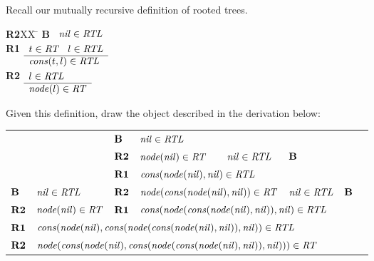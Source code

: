 \documentclass[addpoints]{exam}
\theoremstyle{definition}
\newcommand{\id}[1]{\mbox{\it #1\/}}
\newcommand{\bid}[1]{\mbox{\bf #1}}
\begin{document}
\begin{questions}
\question[3] 
Recall our mutually recursive definition of rooted trees.
\begin{tabbing}
{\bf R2}XX \=  \kill
{\bf B} \>
        \(\begin{array}[t]{l}
        \id{nil}\in\id{RTL}
        \end{array}\) \\[2ex]
{\bf R1} \>
        \(\begin{array}[t]{l}
        t\in\id{RT}\;\;\;l\in\id{RTL} \\
        \hline
        \id{cons}(t,l)\in\id{RTL}
        \end{array}\) \\[2ex]
{\bf R2} \>
        \(\begin{array}[t]{l}
        l\in\id{RTL} \\
        \hline
        \id{node}(l)\in\id{RT}
        \end{array}\)
\end{tabbing}

Given this definition, draw the object described in the derivation below: 

\begin{tabular}{llllllll}
           &                                 & $\bid{B}$             & $\id{nil}\in\id{RTL}$ & & & &\\ 
\cline{4-4}
           &                                 & $\bid{R2}$            & $\id{node}(\id{nil})\in\id{RT}$ & $\id{nil}\in\id{RTL}$ & $\bid{B}$ & & \\ 
\cline{4-5}
           &                                 & $\bid{R1}$            & \multicolumn{2}{l}{$\id{cons}(\id{node}(\id{nil}),\id{nil})\in\id{RTL}$}  & & &\\
\cline{4-5}
$\bid{B}$  & $\id{nil}\in\id{RTL}$           & $\bid{R2}$            & \multicolumn{2}{l}{$\id{node}(\id{cons}(\id{node}(\id{nil}),\id{nil}))\in\id{RT}$} & $\id{nil}\in\id{RTL}$ & $\bid{B}$ &\\ 
\cline{2-2} \cline{4-6}
$\bid{R2}$ & $\id{node}(\id{nil})\in\id{RT}$ & $\bid{R1}$            & \multicolumn{3}{l}{$\id{cons}(\id{node}(\id{cons}(\id{node}(\id{nil}),\id{nil})), \id{nil})\in\id{RTL}$} & & \\
\cline{2-6}
$\bid{R1}$ &
\multicolumn{5}{l}{$\id{cons}(\id{node}(\id{nil}),\id{cons}(\id{node}(\id{cons}(\id{node}(\id{nil}),\id{nil})),\id{nil})) \in \id{RTL}$} & &\\
\cline{2-6}
$\bid{R2}$ & \multicolumn{5}{l}{$\id{node}(\id{cons}(\id{node}(\id{nil}),\id{cons}(\id{node}(\id{cons}(\id{node}(\id{nil}),\id{nil})),\id{nil})))\in\id{RT}$} & &
\end{tabular}


\end{questions}
\end{document}
